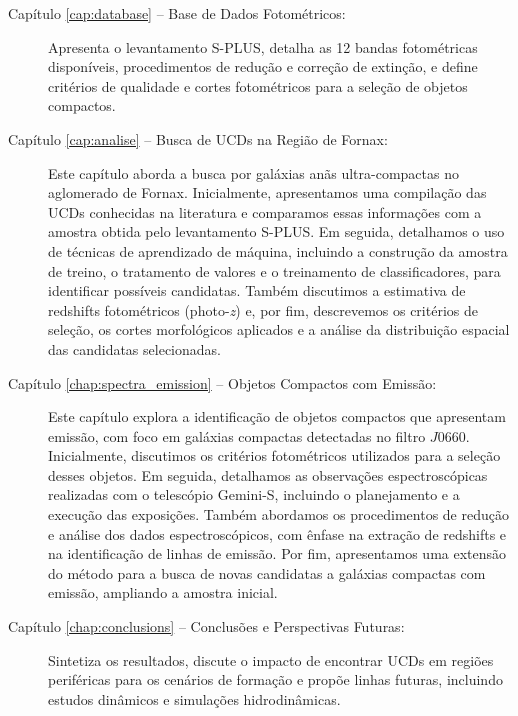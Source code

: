 \begin{description}
\item[Capítulo \ref{cap:database} – Base de Dados Fotométricos:] Apresenta o levantamento S-PLUS, detalha as 12 bandas fotométricas disponíveis, procedimentos de redução e correção de extinção, e define critérios de qualidade e cortes fotométricos para a seleção de objetos compactos.

\item[Capítulo \ref{cap:analise} – Busca de UCDs na Região de Fornax:] Este capítulo aborda a busca por galáxias anãs ultra-compactas no aglomerado de Fornax. Inicialmente, apresentamos uma compilação das UCDs conhecidas na literatura e comparamos essas informações com a amostra obtida pelo levantamento S-PLUS. Em seguida, detalhamos o uso de técnicas de aprendizado de máquina, incluindo a construção da amostra de treino, o tratamento de valores e o treinamento de classificadores, para identificar possíveis candidatas. Também discutimos a estimativa de redshifts fotométricos (photo-\textit{z}) e, por fim, descrevemos os critérios de seleção, os cortes morfológicos aplicados e a análise da distribuição espacial das candidatas selecionadas.

\item[Capítulo \ref{chap:spectra_emission} – Objetos Compactos com Emissão:] Este capítulo explora a identificação de objetos compactos que apresentam emissão, com foco em galáxias compactas detectadas no filtro $J0660$. Inicialmente, discutimos os critérios fotométricos utilizados para a seleção desses objetos. Em seguida, detalhamos as observações espectroscópicas realizadas com o telescópio Gemini-S, incluindo o planejamento e a execução das exposições. Também abordamos os procedimentos de redução e análise dos dados espectroscópicos, com ênfase na extração de redshifts e na identificação de linhas de emissão. Por fim, apresentamos uma extensão do método para a busca de novas candidatas a galáxias compactas com emissão, ampliando a amostra inicial.

\item[Capítulo \ref{chap:conclusions} – Conclusões e Perspectivas Futuras:] Sintetiza os resultados, discute o impacto de encontrar UCDs em regiões periféricas para os cenários de formação e propõe linhas futuras, incluindo estudos dinâmicos e simulações hidrodinâmicas.

\end{description}



















